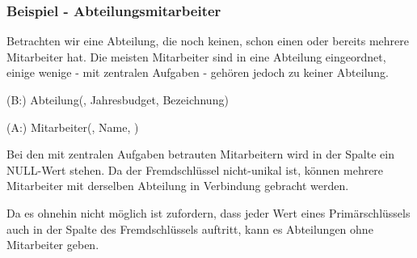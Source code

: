 \subsubsection{Beispiel - Abteilungsmitarbeiter}
Betrachten wir eine Abteilung, die noch keinen, schon einen oder bereits mehrere Mitarbeiter hat. Die meisten Mitarbeiter sind in eine Abteilung eingeordnet, einige wenige - mit zentralen Aufgaben - gehören jedoch zu keiner Abteilung.
\begin{center}
\end{center}
\begin{small}
    (B:) Abteilung(, Jahresbudget, Bezeichnung)

    (A:) Mitarbeiter(, Name, )
\end{small}

Bei den mit zentralen Aufgaben betrauten Mitarbeitern wird in der Spalte  ein NULL-Wert stehen. Da der Fremdschlüssel nicht-unikal ist, können mehrere Mitarbeiter mit derselben Abteilung in Verbindung gebracht werden.

Da es ohnehin nicht möglich ist zufordern, dass jeder Wert eines Primärschlüssels auch in der Spalte des Fremdschlüssels  auftritt, kann es Abteilungen ohne Mitarbeiter geben.
